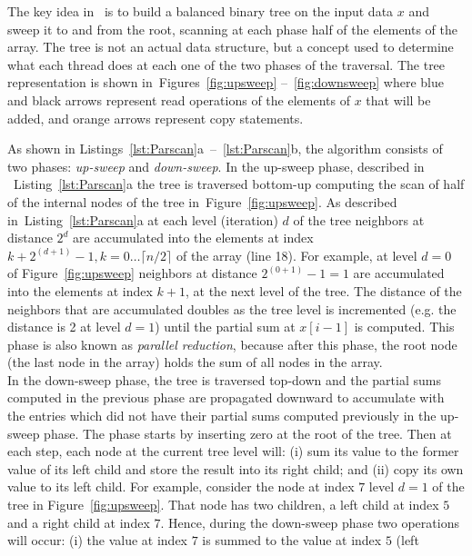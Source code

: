 \documentclass[Ingles]{ic-tese-v1}
\newcommand{\rfig}[1]{Figure~\ref{fig:#1}}
\newcommand{\rfigs}[2]{Figures~\ref{fig:#1} --~\ref{fig:#2}}
\newcommand{\rlsts}[2]{Listing~\ref{lst:#1}{#2}}
\newcommand{\rlstn}[3]{Listings~\ref{lst:#1}{#2}~--~\ref{lst:#1}{#3}}
\begin{document}
The key  idea in~\cite{ScanAsPrimitive} is  to build a  balanced binary
tree on the input data $x$ and  sweep it to and from the root, scanning
at each phase half  of the elements of the array.  The  tree is not an
actual  data structure,  but a  concept  used to  determine what  each
thread does at each one of the  two phases of the traversal.  The tree
representation is  shown in~\rfigs{upsweep}{downsweep} where  blue and
black arrows  represent read  operations of the  elements of  $x$ that
will be added, and orange arrows represent copy statements.

As  shown  in \rlstn{Parscan}{a}{b},  the  algorithm  consists of  two
phases:  \textit{up-sweep} and  \textit{down-sweep}.
In  the up-sweep phase,  described   in  ~\rlsts{Parscan}{a}  the  tree   is  traversed
bottom-up computing the scan of half of the internal nodes of the tree
in~\rfig{upsweep}.  As described in~\rlsts{Parscan}{a} at each level
(iteration)  $d$  of   the  tree  neighbors  at   distance  $2^d$  are
accumulated       into        the       elements        at       index
$k + 2^{(d+1)} - 1, k = 0 \ldots \lceil n/2 \rceil$ of the array (line
18). For  example, at  level $d  = 0$  of \rfig{upsweep}  neighbors at
distance $2^{(0+1)}  - 1  = 1$  are accumulated  into the  elements at
index $k  + 1$, at the  next level of  the tree.  The distance  of the
neighbors  that  are   accumulated  doubles  as  the   tree  level  is
incremented  (e.g.  the  distance is  2 at  level $d  = 1$)  until the
partial sum  at $x[i-1]$  is computed.   This phase  is also  known as
\textit{parallel reduction},  because after this phase,  the root node
(the last node in the array) holds the sum of all nodes in the array.\\
In  the down-sweep  phase,  the  tree is  traversed  top-down and  the
partial sums computed in the previous phase are propagated downward to
accumulate  with the  entries which  did not  have their  partial sums
computed  previously  in the  up-sweep  phase.   The phase  starts  by
inserting zero at the  root of the tree. Then at  each step, each node
at the current tree level will: (i)  sum its value to the former value
of its left child and store the  result into its right child; and (ii)
copy its own value to its  left child.  For example, consider the node
at index $7$  level $d = 1$  of the tree in  \rfig{upsweep}. That node
has two children, a left child at index $5$ and a right child at index
$7$.  Hence,  during the down-sweep  phase two operations  will occur:
(i) the value at  index $7$ is summed to the value  at index $5$ (left
\end{document}
